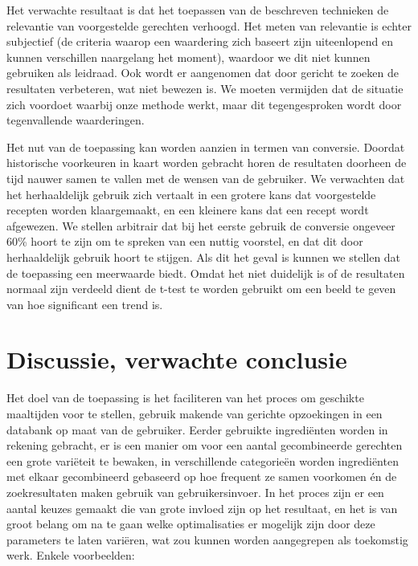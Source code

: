 \documentclass{hogent-article}
\begin{document}

Het verwachte resultaat is dat het toepassen van de beschreven technieken de relevantie van voorgestelde gerechten verhoogd. Het meten van relevantie is echter subjectief (de criteria waarop een waardering zich baseert zijn uiteenlopend en kunnen verschillen naargelang het moment), waardoor we dit niet kunnen gebruiken als leidraad. Ook wordt er aangenomen dat door gericht te zoeken de resultaten verbeteren, wat niet bewezen is. We moeten vermijden dat de situatie zich voordoet waarbij onze methode werkt, maar dit tegengesproken wordt door tegenvallende waarderingen. 

Het nut van de toepassing kan worden aanzien in termen van conversie. Doordat historische voorkeuren in kaart worden gebracht horen de resultaten doorheen de tijd nauwer samen te vallen met de wensen van de gebruiker. We verwachten dat het herhaaldelijk gebruik zich vertaalt in een grotere kans dat voorgestelde recepten worden klaargemaakt, en een kleinere kans dat een recept wordt afgewezen. We stellen arbitrair dat bij het eerste gebruik de conversie ongeveer 60\% hoort te zijn om te spreken van een nuttig voorstel, en dat dit door herhaaldelijk gebruik hoort te stijgen. Als dit het geval is kunnen we stellen dat de toepassing een meerwaarde biedt. Omdat het niet duidelijk is of de resultaten normaal zijn verdeeld dient de t-test te worden gebruikt om een beeld te geven van hoe significant een trend is.

\section{Discussie, verwachte conclusie}%
\label{sec:discussie-conclusie}

Het doel van de toepassing is het faciliteren van het proces om geschikte maaltijden voor te stellen, gebruik makende van gerichte opzoekingen in een databank op maat van de gebruiker. Eerder gebruikte ingrediënten worden in rekening gebracht, er is een manier om voor een aantal gecombineerde gerechten een grote variëteit te bewaken, in verschillende categorieën worden ingrediënten met elkaar gecombineerd gebaseerd op hoe frequent ze samen voorkomen én de zoekresultaten maken gebruik van gebruikersinvoer. In het proces zijn er een aantal keuzes gemaakt die van grote invloed zijn op het resultaat, en het is van groot belang om na te gaan welke optimalisaties er mogelijk zijn door deze parameters te laten variëren, wat zou kunnen worden aangegrepen als toekomstig werk. Enkele voorbeelden:
\end{document}
